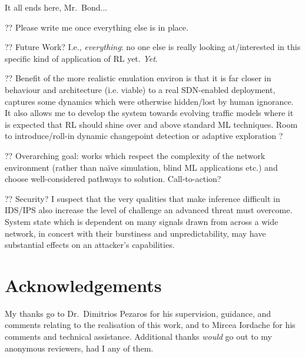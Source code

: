 \documentclass[conference, letterpaper, 10pt, times]{IEEEtran}
\begin{document}
It all ends here, Mr.\ Bond...

?? Please write me once everything else is in place.

?? Future Work? I.e., \emph{everything}: no one else is really looking at/interested in this specific kind of application of RL yet. \emph{Yet}.

?? Benefit of the more realistic emulation environ is that it is far closer in behaviour and architecture (i.e. viable) to a real SDN-enabled deployment, captures some dynamics which were otherwise hidden/lost by human ignorance. It also allows me to develop the system towards evolving traffic models where it is expected that RL should shine over and above standard ML techniques. Room to introduce/roll-in dynamic changepoint detection or adaptive exploration \cite{DBLP:conf/ki/Tokic10, DBLP:conf/ki/TokicP11, DBLP:conf/annpr/TokicP12}?

?? Overarching goal: works which respect the complexity of the network environment (rather than na\"{i}ve simulation, blind ML applications etc.) and choose well-considered pathways to solution. Call-to-action?

?? Security? I suspect that the very qualities that make inference difficult in IDS/IPS also increase the level of challenge an advanced threat must overcome.
System state which is dependent on many signals drawn from across a wide network, in concert with their burstiness and unpredictability, may have substantial effects on an attacker's capabilities.

\section*{Acknowledgements}
My thanks go to Dr.\ Dimitrios Pezaros for his supervision, guidance, and comments relating to the realisation of this work, and to Mircea Iordache for his comments and technical assistance.
Additional thanks \emph{would} go out to my anonymous reviewers, had I any of them.

\printbibliography
\end{document}
